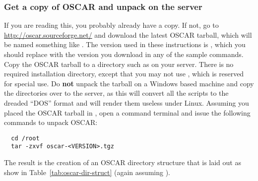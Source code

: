 \subsubsection{Get a copy of OSCAR and unpack on the server} 

If you are reading this, you probably already have a copy. If not, go
to \url{http://oscar.sourceforge.net/} and download the latest OSCAR
tarball, which will be named something like .
The version used in these instructions is \oscarversion, which you
should replace with the version you download in any of the sample
\begchange
commands. Copy the OSCAR tarball to a directory such as  on
\endchange
your server. There is no required installation directory, except that
you may not use , which is reserved for special
use. Do {\bf not} unpack the tarball on a Windows based machine and
copy the directories over to the server, as this will convert all the
scripts to the dreaded ``DOS'' format and will render them useless
under Linux.  Assuming you placed the OSCAR tarball in
\begchange
{},
\endchange
open a command terminal and issue the following commands to unpack
OSCAR:

\begchange
\begin{verbatim}
  cd /root
  tar -zxvf oscar-<VERSION>.tgz
\end{verbatim}
\endchange
    
The result is the creation of an OSCAR directory structure that is
laid out as show in Table~\ref{tab:oscar-dir-struct} (again assuming
\begchange
{}).
\endchange


